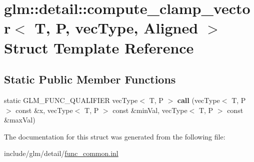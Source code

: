 \hypertarget{structglm_1_1detail_1_1compute__clamp__vector}{}\section{glm\+:\+:detail\+:\+:compute\+\_\+clamp\+\_\+vector$<$ T, P, vec\+Type, Aligned $>$ Struct Template Reference}
\label{structglm_1_1detail_1_1compute__clamp__vector}
\subsection*{Static Public Member Functions}
\begin{DoxyCompactItemize}
\item 
\mbox{\label{structglm_1_1detail_1_1compute__clamp__vector_ab2a4cd94a8457eec40e9cca5a576fe22}} 
static G\+L\+M\+\_\+\+F\+U\+N\+C\+\_\+\+Q\+U\+A\+L\+I\+F\+I\+ER vec\+Type$<$ T, P $>$ {\bfseries call} (vec\+Type$<$ T, P $>$ const \&x, vec\+Type$<$ T, P $>$ const \&min\+Val, vec\+Type$<$ T, P $>$ const \&max\+Val)
\end{DoxyCompactItemize}


The documentation for this struct was generated from the following file\+:\begin{DoxyCompactItemize}
\item 
include/glm/detail/\hyperlink{func__common_8inl}{func\+\_\+common.\+inl}\end{DoxyCompactItemize}
